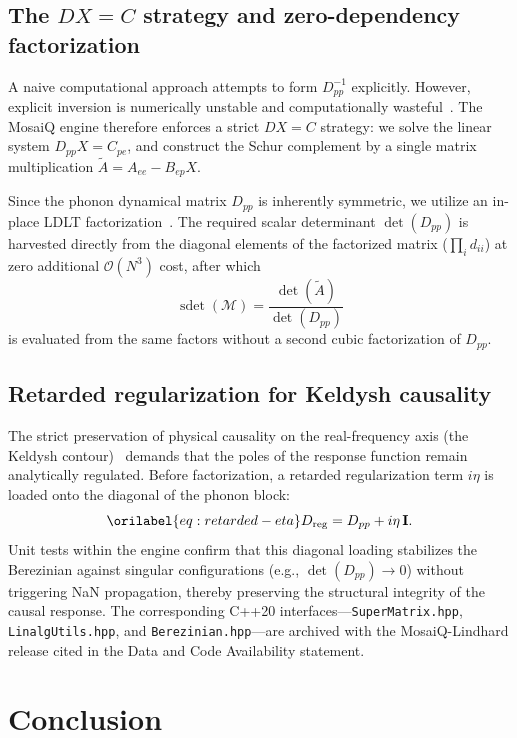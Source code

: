 \documentclass[aps,showkeys,noshowpacs,superscriptaddress,pre,preprint]{revtex4-2}
\let\label\orilabel
\begin{document}
\subsection{The $DX = C$ strategy and zero-dependency factorization}
A naive computational approach attempts to form $D_{pp}^{-1}$ explicitly.
However, explicit inversion is numerically unstable and computationally wasteful~\cite{NR,Golub-VanLoan2013}.
The MosaiQ engine therefore enforces a strict $DX = C$ strategy:
we solve the linear system $D_{pp} X = C_{pe}$, and construct the Schur complement by a single matrix multiplication
$\tilde{A} = A_{ee} - B_{ep} X$.

Since the phonon dynamical matrix $D_{pp}$ is inherently symmetric, we utilize an in-place LDLT factorization~\cite{NR,Golub-VanLoan2013}.
The required scalar determinant $\det(D_{pp})$ is harvested directly from the diagonal elements of the factorized matrix ($\prod_i d_{ii}$) at zero additional $\mathcal{O}(N^3)$ cost, after which
\begin{equation}
\operatorname{sdet}(\mathcal{M})
=
\frac{\det(\tilde{A})}{\det(D_{pp})}
\end{equation}
is evaluated from the same factors without a second cubic factorization of $D_{pp}$.

\subsection{Retarded regularization for Keldysh causality}
The strict preservation of physical causality on the real-frequency axis (the Keldysh contour)~\cite{Kadanoff1962,Stefanucci2013,Kim2018} demands that the poles of the response function remain analytically regulated.
Before factorization, a retarded regularization term $i\eta$ is loaded onto the diagonal of the phonon block:
\begin{equation}
\label{eq:retarded-eta}
D_{\mathrm{reg}}
=
D_{pp} + i\eta\,\mathbf{I}.
\end{equation}
Unit tests within the engine confirm that this diagonal loading stabilizes the Berezinian against singular configurations (e.g., $\det(D_{pp})\to 0$) without triggering NaN propagation, thereby preserving the structural integrity of the causal response.
The corresponding C++20 interfaces---\texttt{SuperMatrix.hpp}, \texttt{LinalgUtils.hpp}, and \texttt{Berezinian.hpp}---are archived with the MosaiQ-Lindhard release cited in the Data and Code Availability statement.

\section{Conclusion}
\label{sec:conclusion}
\end{document}
